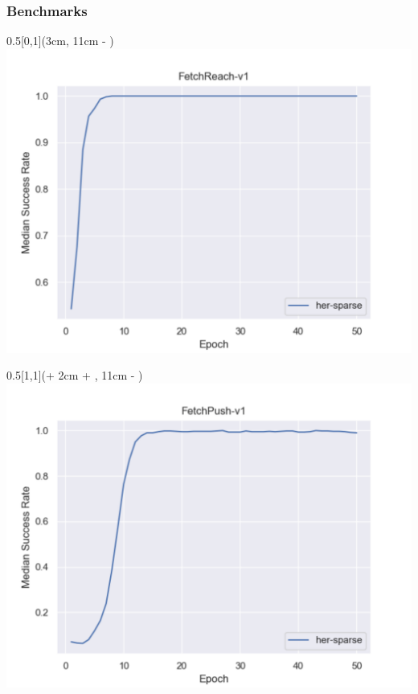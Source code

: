 \begin{frame}
	\frametitle{Benchmarks}	
	\vspace{1cm}
	
	
	\begin{textblock*}{0.5\paperwidth}[0,1](3cm, 11cm - \PraesentationSeitenrand)%
		\includegraphics[width=0.3\paperwidth]{./Ressourcen/Figures/fig_FetchReach-v1.pdf}
	\end{textblock*}
	
	\begin{textblock*}{0.5\paperwidth}[1,1](\textwidth + 2cm + \PraesentationSeitenrand, 11cm - \PraesentationSeitenrand)%
		\includegraphics[width=0.3\paperwidth]{./Ressourcen/Figures/fig_FetchPush-v1.pdf}
	\end{textblock*}
	

\end{frame}
